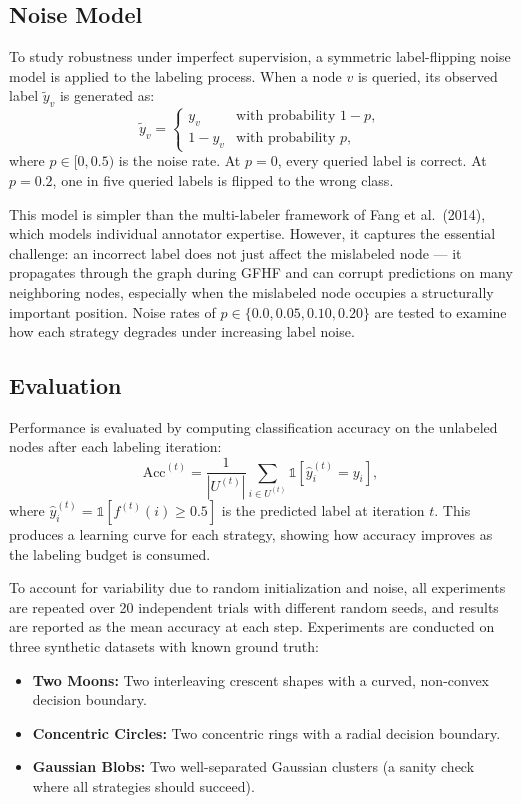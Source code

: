 \documentclass{article}
\begin{document}
\subsection{Noise Model}

To study robustness under imperfect supervision, a symmetric label-flipping noise model is applied to the labeling process. When a node $v$ is queried, its observed label $\tilde{y}_v$ is generated as:
\[
\tilde{y}_v =
\begin{cases}
y_v & \text{with probability } 1 - p, \\
1 - y_v & \text{with probability } p,
\end{cases}
\]
where $p \in [0, 0.5)$ is the noise rate. At $p = 0$, every queried label is correct. At $p = 0.2$, one in five queried labels is flipped to the wrong class.

This model is simpler than the multi-labeler framework of Fang et al.\ (2014), which models individual annotator expertise. However, it captures the essential challenge: an incorrect label does not just affect the mislabeled node --- it propagates through the graph during GFHF and can corrupt predictions on many neighboring nodes, especially when the mislabeled node occupies a structurally important position. Noise rates of $p \in \{0.0, 0.05, 0.10, 0.20\}$ are tested to examine how each strategy degrades under increasing label noise.

\subsection{Evaluation}

Performance is evaluated by computing classification accuracy on the unlabeled nodes after each labeling iteration:
\[
\text{Acc}^{(t)} = \frac{1}{|U^{(t)}|}\sum_{i \in U^{(t)}} \mathbb{1}\!\left[\hat{y}_i^{(t)} = y_i\right],
\]
where $\hat{y}_i^{(t)} = \mathbb{1}[f^{(t)}(i) \geq 0.5]$ is the predicted label at iteration $t$. This produces a learning curve for each strategy, showing how accuracy improves as the labeling budget is consumed.

To account for variability due to random initialization and noise, all experiments are repeated over 20 independent trials with different random seeds, and results are reported as the mean accuracy at each step. Experiments are conducted on three synthetic datasets with known ground truth:

\begin{itemize}
\item \textbf{Two Moons:} Two interleaving crescent shapes with a curved, non-convex decision boundary.
\item \textbf{Concentric Circles:} Two concentric rings with a radial decision boundary.
\item \textbf{Gaussian Blobs:} Two well-separated Gaussian clusters (a sanity check where all strategies should succeed).
\end{itemize}
\end{document}

